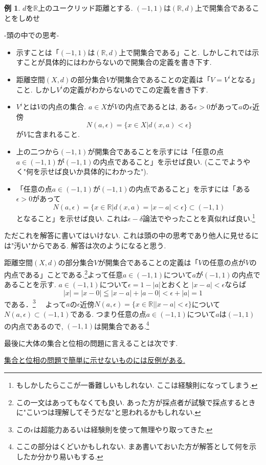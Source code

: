 \documentclass[dvipdfmx,a4paper,11pt]{article}
\newcommand{\R}{\mathbb{R}}
\theoremstyle{definition}
\newtheorem{exa}[thm]{例}
\begin{document}
\begin{exa}
$d$を$\R$上のユークリッド距離とする. $(-1,1)$は$(\R,d)$上で開集合であることをしめせ

-頭の中での思考-
\begin{itemize}
  \setlength{\parskip}{0cm} %
  \setlength{\itemsep}{0cm} %
\item 示すことは「$(-1,1)$は$(\R,d)$上で開集合である」こと. しかしこれでは示すことが具体的にはわからないので開集合の定義を書き下す.
\item 距離空間$(X,d)$の部分集合$V$が開集合であることの定義は「$V = V^i$となる」こと. しかし$V^i$の定義がわからないのでこの定義を書き下す.
\item $V^i$とは$V$の内点の集合. $a \in X$が$V$の内点であるとは, ある$\epsilon >0$があって$a$の$\epsilon$近傍
$$
N(a,\epsilon) = \{ x \in X | d(x,a) <\epsilon\}
$$
が$V$に含まれること.
\item 上の二つから$(-1,1)$が開集合であることを示すには「任意の点$a \in (-1,1)$が$(-1,1)$の内点であること」を示せば良い. (ここでようやく"何を示せば良いか具体的にわかった").
 \item 「任意の点$a \in (-1,1)$が$(-1,1)$の内点であること」を示すには「ある$\epsilon >0$があって
 $$N(a,\epsilon) = \{ x \in \R | d(x,a)=|x-a| <\epsilon\} \subset (-1,1)$$
 となること」を示せば良い. これは$\epsilon-\delta$論法でやったことを真似れば良い.\footnote{もしかしたらここが一番難しいもしれない. ここは経験則になってしまう.}
 \end{itemize}
 ただこれを解答に書いてはいけない. これは頭の中の思考であり他人に見せるには"汚い"からである. 解答は次のようになると思う.
  
 \newpage
 [解答例.] 距離空間$(X,d)$の部分集合$V$が開集合であることの定義は「$V$の任意の点が$V$の内点である」ことである.\footnote{この一文はあってもなくても良い. あった方が採点者が試験で採点するときに"こいつは理解してそうだな"と思われるかもしれない.}よって任意$a \in (-1,1)$について$a$が$(-1,1)$の内点であることを示す. $a \in (-1,1)$について$\epsilon = 1 - |a|$とおくと
 $|x-a| < \epsilon$ならば
 $$
|x|=|x-0| \leqq |x-a| + |a-0| <\epsilon +|a| = 1
 $$
 である．\footnote{この$\epsilon$は超能力あるいは経験則を使って無理やり取ってきた.}　
 よって$a$の$\epsilon$近傍$N(a,\epsilon)=\{ x \in \R | |x-a| <\epsilon\}$について$N(a,\epsilon) \subset (-1,1)$である. つまり任意の点$a \in (-1,1)$について$a$は$(-1,1)$の内点であるので, $(-1,1)$は開集合である.\footnote{ここの部分はくどいかもしれない. まあ書いておいた方が解答として何を示したか分かり易いもする.}
\end{exa}

\vspace{11pt}
最後に大体の集合と位相の問題に言えることは次です.
\begin{center}
\underline{集合と位相の問題で簡単に示せないものには反例がある.}
\end{center}




 
\end{document}
